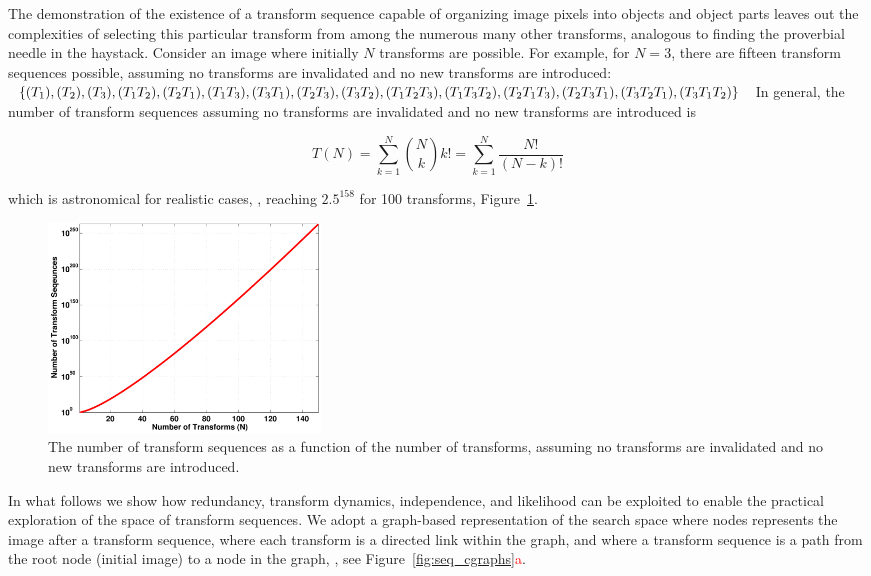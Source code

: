 The demonstration of the existence of a transform sequence capable of organizing image pixels into objects and object parts leaves out the complexities of selecting this particular transform from among the numerous many other transforms, analogous to finding the proverbial needle in the haystack. Consider an image where initially $N$ transforms are possible. For example, for $N=3$, there are fifteen transform sequences possible, assuming no transforms are invalidated and no new transforms are introduced: $\{(T_1),(T_2),(T_3),(T_1T_2),(T_2T_1),(T_1T_3),(T_3T_1),(T_2T_3),(T_3T_2),\newline(T_1T_2T_3),(T_1T_3T_2),(T_2T_1T_3),(T_2T_3T_1),(T_3T_2T_1),(T_3T_1T_2)\}$ In general, the number of transform sequences assuming no transforms are invalidated and no new transforms are introduced is

\begin{equation}
T(N)=\sum_{k=1}^{N}\binom{N}{k}k!=\sum_{k=1}^{N}\frac{N!}{(N-k)!}
\label{eq:complexity}
\end{equation}

\noindent
which is astronomical for realistic cases, \eg, reaching $2.5^{158}$ for 100 transforms, Figure~\ref{fig:ss_growth}. 

\begin{figure}[ht]
\centering
\includegraphics[width=0.35\textwidth]{figs/ss_growth.pdf}
\caption{The number of transform sequences as a function of the number of transforms, assuming no transforms are invalidated and no new transforms are introduced.}
\label{fig:ss_growth}
\end{figure}

In what follows we show how redundancy, transform dynamics, independence, and likelihood can be exploited to enable the practical exploration of the space of transform sequences. We adopt a graph-based representation of the search space where nodes represents the image after a transform sequence, where each transform is a directed link within the graph, and where a transform sequence is a path from the root node (initial image) to a node in the graph, \eg, see Figure~\ref{fig:seq_cgraphs}\textcolor{red}{a}.


